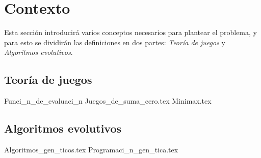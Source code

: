 \section{Contexto}
  Esta sección introducirá varios conceptos necesarios para plantear el problema, y para esto se 
  dividirán las definiciones en dos partes: \textit{Teoría de juegos} y \textit{Algoritmos 
  evolutivos}.


  \subsection{Teoría de juegos}    
    {Funci_n_de_evaluaci_n}
    {Juegos_de_suma_cero.tex}
    {Minimax.tex}

  \subsection{Algoritmos evolutivos}
    {Algoritmos_gen_ticos.tex}
    {Programaci_n_gen_tica.tex}